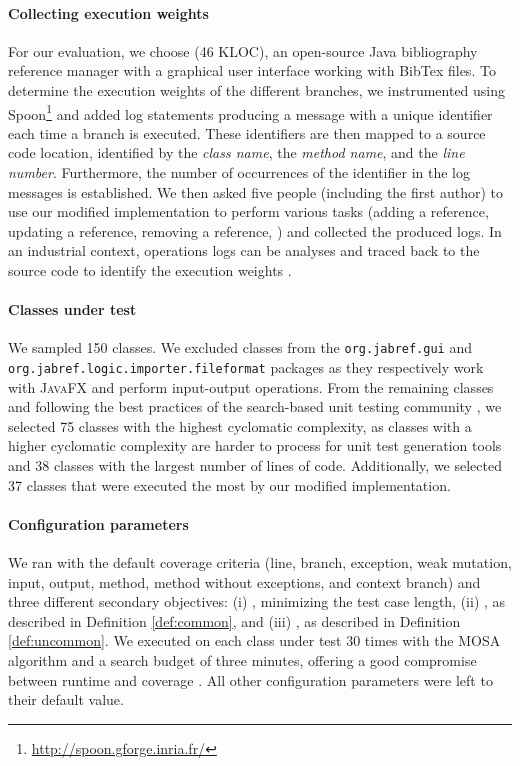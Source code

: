 \paragraph{Collecting execution weights}
%
For our evaluation, we choose \jabref (46 KLOC), an open-source Java bibliography reference manager with a graphical user interface working with BibTex files. To determine the execution weights of the different branches, we instrumented \jabref using Spoon\footnote{\url{http://spoon.gforge.inria.fr/}} and added log statements producing a message with a unique identifier each time a branch is executed. These identifiers are then mapped to a source code location, identified by the \emph{class name}, the \emph{method name}, and the \emph{line number}. Furthermore, the number of occurrences of the identifier in the log messages is established. We then asked five people (including the first author) to use our modified \jabref implementation to perform various tasks (adding a reference, updating a reference, removing a reference, \etc) and collected the produced logs. In an industrial context, operations logs can be analyses and traced back to the source code to identify the execution weights \cite{Winter2019}. 

\paragraph{Classes under test}
%
We sampled 150 classes. We excluded classes from the \texttt{org.\-jab\-ref.gui} and \texttt{org.jabref.\-logic.importer.fileformat} packages as they respectively work with \textsc{JavaFX} and perform input-output operations. 
From the remaining classes and following the best practices of the search-based unit testing community \cite{Molina2018}, we selected 75 classes with the highest cyclomatic complexity, as classes with a higher cyclomatic complexity are harder to process for unit test generation tools and 38 classes with the largest number of lines of code. Additionally, we selected 37 classes that were executed the most by our modified \jabref implementation. 

\paragraph{Configuration parameters}
%
We ran \evosuite with the default coverage criteria (line, branch, exception, weak mutation, input, output, method, method without exceptions, and context branch) and three different secondary objectives: 
(i) \df, minimizing the test case length,
(ii) \com, as described in Definition \ref{def:common}, 
and (iii) \ucom, as described in Definition \ref{def:uncommon}.
We executed \evosuite on each class under test 30 times with the MOSA algorithm \cite{Panichella2015} and a search budget of three minutes, offering a good compromise between runtime and coverage \cite{Fraser2014b, Panichella2018a}. All other configuration parameters were left to their default value. 



